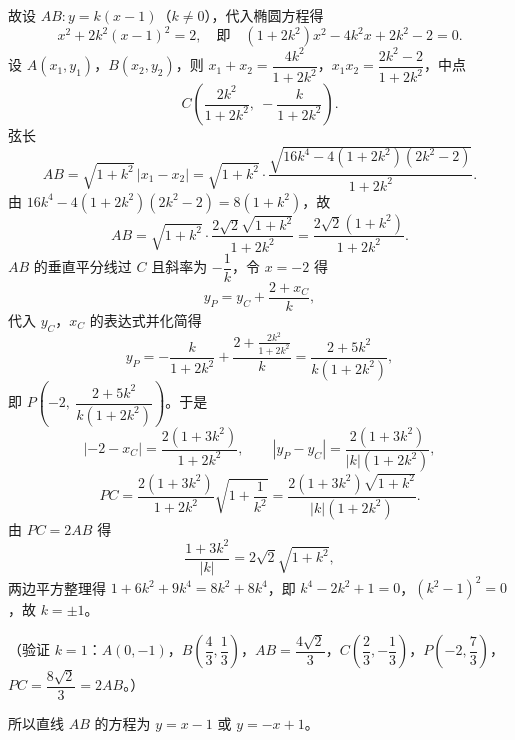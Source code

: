 \begin{answer}
故设 \(AB:y=k(x-1)\)（\(k\ne0\)），代入椭圆方程得
\nopagebreak[4]
\[
x^{2}+2k^{2}(x-1)^{2}=2,\quad\text{即}\quad(1+2k^{2})x^{2}-4k^{2}x+2k^{2}-2=0.
\]
设 \(A(x_{1},y_{1})\)，\(B(x_{2},y_{2})\)，则 \(x_{1}+x_{2}=\dfrac{4k^{2}}{1+2k^{2}}\)，\(x_{1}x_{2}=\dfrac{2k^{2}-2}{1+2k^{2}}\)，中点
\nopagebreak[4]
\[
C\left(\frac{2k^{2}}{1+2k^{2}},\ -\frac{k}{1+2k^{2}}\right).
\]
弦长
\nopagebreak[4]
\[
AB=\sqrt{1+k^{2}}\,|x_{1}-x_{2}|=\sqrt{1+k^{2}}\cdot\frac{\sqrt{16k^{4}-4(1+2k^{2})(2k^{2}-2)}}{1+2k^{2}}.
\]
由 \(16k^{4}-4(1+2k^{2})(2k^{2}-2)=8(1+k^{2})\)，故
\nopagebreak[4]
\[
AB=\sqrt{1+k^{2}}\cdot\frac{2\sqrt{2}\sqrt{1+k^{2}}}{1+2k^{2}}=\frac{2\sqrt{2}(1+k^{2})}{1+2k^{2}}.
\]
\(AB\) 的垂直平分线过 \(C\) 且斜率为 \(-\dfrac{1}{k}\)，令 \(x=-2\) 得
\nopagebreak[4]
\[
y_{P}=y_{C}+\frac{2+x_{C}}{k},
\]
代入 \(y_{C}\)，\(x_{C}\) 的表达式并化简得
\nopagebreak[4]
\[
y_{P}=-\frac{k}{1+2k^{2}}+\frac{2+\frac{2k^{2}}{1+2k^{2}}}{k}=\frac{2+5k^{2}}{k(1+2k^{2})},
\]
即 \(P\left(-2,\ \dfrac{2+5k^{2}}{k(1+2k^{2})}\right)\)。于是
\nopagebreak[4]
\[
\left|-2-x_{C}\right|=\frac{2(1+3k^{2})}{1+2k^{2}},\qquad
\left|y_{P}-y_{C}\right|=\frac{2(1+3k^{2})}{|k|(1+2k^{2})},
\]
\nopagebreak[4]
\[
PC=\frac{2(1+3k^{2})}{1+2k^{2}}\sqrt{1+\frac{1}{k^{2}}}=\frac{2(1+3k^{2})\sqrt{1+k^{2}}}{|k|(1+2k^{2})}.
\]
由 \(PC=2AB\) 得
\nopagebreak[4]
\[
\frac{1+3k^{2}}{|k|}=2\sqrt{2}\sqrt{1+k^{2}},
\]
两边平方整理得 \(1+6k^{2}+9k^{4}=8k^{2}+8k^{4}\)，即 \(k^{4}-2k^{2}+1=0\)，\((k^{2}-1)^{2}=0\)，故 \(k=\pm1\)。

（验证 \(k=1\)：\(A(0,-1)\)，\(B\left(\dfrac{4}{3},\dfrac{1}{3}\right)\)，\(AB=\dfrac{4\sqrt{2}}{3}\)，\(C\left(\dfrac{2}{3},-\dfrac{1}{3}\right)\)，\(P\left(-2,\dfrac{7}{3}\right)\)，\(PC=\dfrac{8\sqrt{2}}{3}=2AB\)。）

所以直线 \(AB\) 的方程为 \(y=x-1\) 或 \(y=-x+1\)。



\end{answer}
